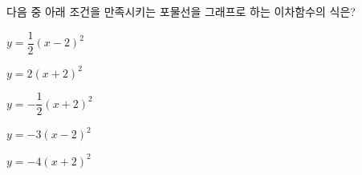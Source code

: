 다음 중 아래 조건을 만족시키는 포물선을 그래프로 하는 이차함수의 식은?
\begin{choicesii}{\rule[-3ex]{0pt}{8ex}$y=\dfrac{1}{2}(x-2)^2$}{\rule[-3ex]{0pt}{8ex}$y=2(x+2)^2$}{\rule[-3ex]{0pt}{8ex}$y=-\dfrac{1}{2}(x+2)^2$}{\rule[-3ex]{0pt}{8ex}$y=-3(x-2)^2$}{\rule[-3ex]{0pt}{8ex}$y=-4(x+2)^2$}\end{choicesii}
